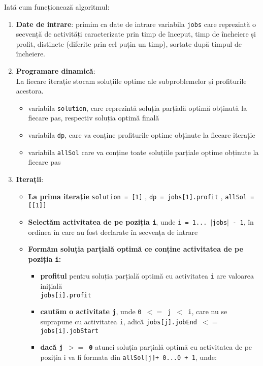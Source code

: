 Iată cum funcționează algoritmul:
\begin{enumerate}
    \item \textbf{Date de intrare}: primim ca date de intrare variabila \texttt{jobs} care reprezintă o secvență de activități caracterizate prin timp de început, timp de încheiere și profit,  distincte (diferite prin cel puțin un timp), sortate după timpul de încheiere.
    \item \textbf{Programare dinamică}: \\
    La fiecare iterație stocam soluțiile optime ale subproblemelor și profiturile acestora.
    \begin{itemize}
        \item variabila \texttt{solution}, care reprezintă soluția parțială optimă obținută la fiecare pas, respectiv soluția optimă finală 
        \item variabila \texttt{dp}, care va conține profiturile optime obținute la fiecare iterație
        \item  variabila \texttt{allSol} care va conține toate soluțiile parțiale optime obținute la fiecare pas
    \end{itemize} 
    \item \textbf{Iterații}: 
    \begin{itemize}
        \item \textbf{La prima iterație} \texttt{solution = [1]} , \texttt{dp = jobs[1].profit} , \texttt{allSol = [[1]]} 
        \item \textbf{Selectăm activitatea de pe poziția \texttt{i}}, unde \texttt{i = 1... $|$jobs$|$ - 1}, în ordinea în care au fost declarate în secvența de intrare
        \item \textbf{Formăm soluția parțială optimă ce conține activitatea de pe poziția \texttt{i}: }
        \begin{itemize}
            \item \textbf{profitul} pentru soluția parțială optimă cu activitatea \texttt{i} are valoarea inițială \\\texttt{jobs[i].profit}
            \item \textbf{cautăm o activitate \texttt{j}}, unde \texttt{0 $<$$=$ j $<$ i}, care nu se suprapune cu activitatea \texttt{i}, adică \texttt{jobs[j].jobEnd $<$$=$ jobs[i].jobStart }
            \item \textbf{dacă \texttt{j $>$$=$ 0}} atunci soluția parțială optimă cu activitatea de pe poziția i va fi formata din 
            \texttt{allSol[j]+ 0...0 + 1}, unde:

\end{itemize}
\end{itemize}
\end{enumerate}
